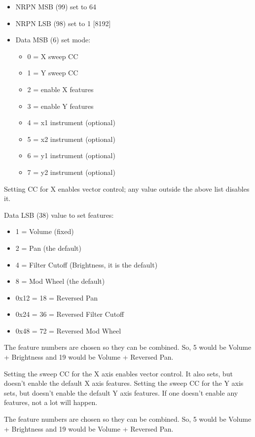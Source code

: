    \begin{itemize}
      \item NRPN MSB (99) set to 64
      \item NRPN LSB (98) set to 1 [8192]
      \item Data MSB (6) set mode:
      \begin{itemize}
         \item 0 = X sweep CC
         \item 1 = Y sweep CC
         \item 2 = enable X features
         \item 3 = enable Y features
         \item 4 = x1 instrument (optional)
         \item 5 = x2 instrument (optional)
         \item 6 = y1 instrument (optional)
         \item 7 = y2 instrument (optional)
      \end{itemize}
   \end{itemize}

   Setting CC for X enables vector control; any value outside the above list
   disables it.

   Data LSB (38) value to set features:

   \begin{itemize}
       \item 1 = Volume (fixed)
       \item 2 = Pan (the default)
       \item 4 = Filter Cutoff (Brightness, it is the default)
       \item 8 = Mod Wheel (the default)
       \item 0x12 = 18 = Reversed Pan
       \item 0x24 = 36 = Reversed Filter Cutoff
       \item 0x48 = 72 = Reversed Mod Wheel
   \end{itemize}

   The feature numbers are chosen so they can be combined. So, 5 would be
   Volume + Brightness and 19 would be Volume + Reversed Pan.

   Setting the sweep CC for the X axis enables vector control. It also sets,
   but doesn't enable the default X axis features.  Setting the sweep CC for
   the Y axis sets, but doesn't enable the default Y axis features.  If one
   doesn't enable any features, not a lot will happen.

   The feature numbers are chosen so they can be combined. So, 5 would be
   Volume + Brightness and 19 would be Volume + Reversed Pan.


